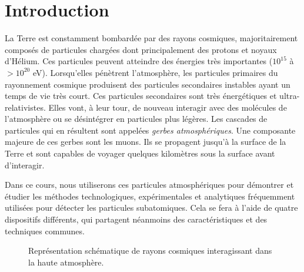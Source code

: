 \section{Introduction}
\setcounter{page}{1}

La Terre est constamment bombardée par des rayons cosmiques, majoritairement composés de particules chargées dont principalement des protons et noyaux d'Hélium. Ces particules peuvent atteindre des énergies très importantes ($10^{15}$ à $>10^{20}$ eV). Lorsqu'elles pénètrent l'atmosphère, les particules primaires du rayonnement cosmique produisent des particules secondaires instables ayant un temps de vie très court. Ces particules secondaires sont très énergétiques et ultra-relativistes. Elles vont, à leur tour, de nouveau interagir avec des molécules de l'atmosphère ou se désintégrer en particules plus légères. Les cascades de particules qui en résultent sont appelées \textit{gerbes atmosphériques}. Une composante majeure de ces gerbes sont les muons. Ils se propagent jusqu'à la surface de la Terre et sont capables de voyager quelques kilomètres sous la surface avant d'interagir.

Dans ce cours, nous utiliserons ces particules atmosphériques pour démontrer et étudier les méthodes technologiques, expérimentales et analytiques fréquemment utilisées pour détecter les particules subatomiques. Cela se fera à l'aide de quatre dispositifs différents, qui partagent néanmoins des caractéristiques et des techniques communes.

\begin{figure}[hb]
    \caption{\label{fig:CR} Représentation schématique de rayons cosmiques interagissant dans la haute atmosphère.}
\end{figure}

